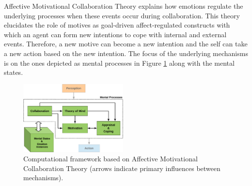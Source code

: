 \documentclass[journal, 11pt]{IEEEtran}
\begin{document}
Affective Motivational Collaboration Theory explains how emotions regulate the
underlying processes when these events occur during collaboration. This theory
elucidates the role of motives as goal-driven affect-regulated constructs with
which an agent can form new intentions to cope with internal and external
events. Therefore, a new motive can become a new intention and the self can take
a new action based on the new intention.  The focus of the underlying mechanisms
is on the ones depicted as mental processes in Figure \ref{fig:cpm} along with
the mental states.

\begin{figure}[!t]
  \centering
  \includegraphics[width=0.485\textwidth]{figs/theory-general-croped.pdf}
  \caption{{\fontsize{10}{10}\selectfont Computational framework based on
  Affective Motivational Collaboration Theory (arrows indicate primary
  influences between mechanisms).}}
  \label{fig:cpm}
\end{figure}
\end{document}
